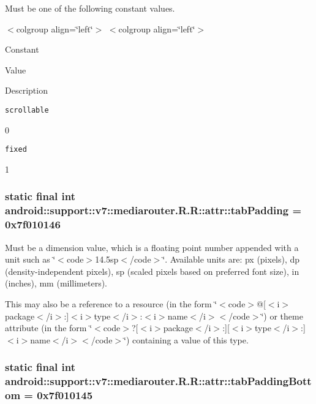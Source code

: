 Must be one of the following constant values. \begin{TabularC}{0}
\hline
\end{TabularC}
$<$colgroup align=\char`\"{}left\char`\"{}$>$ $<$colgroup align=\char`\"{}left\char`\"{}$>$ 

Constant

Value

Description 

{\tt scrollable}

0

{\tt fixed}

1\hypertarget{classandroid_1_1support_1_1v7_1_1mediarouter_1_1_r_1_1attr_6b034b92e1860e7d6b61c61d101f13e0}{
\subsubsection[{tabPadding}]{\setlength{\rightskip}{0pt plus 5cm}static final int android::support::v7::mediarouter.R.R::attr::tabPadding = 0x7f010146}}
\label{classandroid_1_1support_1_1v7_1_1mediarouter_1_1_r_1_1attr_6b034b92e1860e7d6b61c61d101f13e0}


Must be a dimension value, which is a floating point number appended with a unit such as \char`\"{}$<$code$>$14.5sp$<$/code$>$\char`\"{}. Available units are: px (pixels), dp (density-independent pixels), sp (scaled pixels based on preferred font size), in (inches), mm (millimeters). 

This may also be a reference to a resource (in the form \char`\"{}$<$code$>$@\mbox{[}$<$i$>$package$<$/i$>$:\mbox{]}$<$i$>$type$<$/i$>$:$<$i$>$name$<$/i$>$$<$/code$>$\char`\"{}) or theme attribute (in the form \char`\"{}$<$code$>$?\mbox{[}$<$i$>$package$<$/i$>$:\mbox{]}\mbox{[}$<$i$>$type$<$/i$>$:\mbox{]}$<$i$>$name$<$/i$>$$<$/code$>$\char`\"{}) containing a value of this type. \hypertarget{classandroid_1_1support_1_1v7_1_1mediarouter_1_1_r_1_1attr_271b365b5cbd75a7ea57fdac51b8576c}{
\subsubsection[{tabPaddingBottom}]{\setlength{\rightskip}{0pt plus 5cm}static final int android::support::v7::mediarouter.R.R::attr::tabPaddingBottom = 0x7f010145}}
\label{classandroid_1_1support_1_1v7_1_1mediarouter_1_1_r_1_1attr_271b365b5cbd75a7ea57fdac51b8576c}


